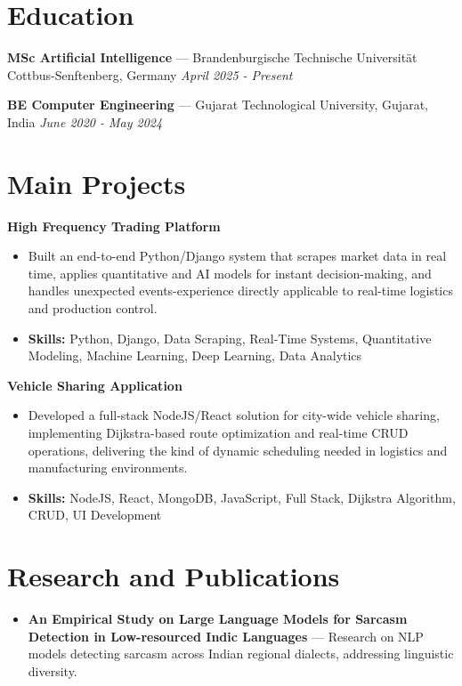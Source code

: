 \documentclass[a4paper,10pt]{article}
\begin{document}
\section*{Education}
\textbf{MSc Artificial Intelligence} — Brandenburgische Technische Universität Cottbus-Senftenberg, Germany \hfill \textit{April 2025 - Present}\par
\vspace{1.5pt}
\textbf{BE Computer Engineering} — Gujarat Technological University, Gujarat, India \hfill \textit{June 2020 - May 2024}\par

\section*{Main Projects}
\textbf{High Frequency Trading Platform}\par
\vspace{1pt}
\begin{itemize}
  \item Built an end-to-end Python/Django system that scrapes market data in real time, applies quantitative and AI models for instant decision-making, and handles unexpected events-experience directly applicable to real-time logistics and production control.
  \item \textbf{Skills:} Python, Django, Data Scraping, Real-Time Systems, Quantitative Modeling, Machine Learning, Deep Learning, Data Analytics
\end{itemize}
\vspace{3pt}
\textbf{Vehicle Sharing Application}\par
\vspace{1pt}
\begin{itemize}
  \item Developed a full-stack NodeJS/React solution for city-wide vehicle sharing, implementing Dijkstra-based route optimization and real-time CRUD operations, delivering the kind of dynamic scheduling needed in logistics and manufacturing environments.
  \item \textbf{Skills:} NodeJS, React, MongoDB, JavaScript, Full Stack, Dijkstra Algorithm, CRUD, UI Development
\end{itemize}

\section*{Research and Publications}
\begin{itemize}
\item \textbf{An Empirical Study on Large Language Models for Sarcasm Detection in Low-resourced Indic Languages} — Research on NLP models detecting sarcasm across Indian regional dialects, addressing linguistic diversity.
\end{itemize}
\end{document}
